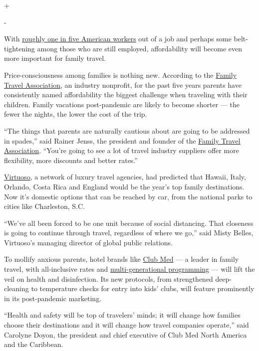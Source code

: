 +

-

With
\href{https://www.nytimes.com/2020/04/30/business/economy/coronavirus-unemployment-claims.html}{roughly
one in five American workers} out of a job and perhaps some
belt-tightening among those who are still employed, affordability will
become even more important for family travel.

Price-consciousness among families is nothing new. According to the
\href{https://familytravel.org/}{Family Travel Association}, an industry
nonprofit, for the past five years parents have consistently named
affordability the biggest challenge when traveling with their children.
Family vacations post-pandemic are likely to become shorter --- the
fewer the nights, the lower the cost of the trip.

``The things that parents are naturally cautious about are going to be
addressed in spades,'' said Rainer Jenss, the president and founder of
the \href{https://familytravel.org/}{Family Travel Association}.
``You're going to see a lot of travel industry suppliers offer more
flexibility, more discounts and better rates.''

\href{https://www.virtuoso.com/}{Virtuoso}, a network of luxury travel
agencies, had predicted that Hawaii, Italy, Orlando, Costa Rica and
England would be the year's top family destinations. Now it's domestic
options that can be reached by car, from the national parks to cities
like Charleston, S.C.

``We've all been forced to be one unit because of social distancing.
That closeness is going to continue through travel, regardless of where
we go,'' said Misty Belles, Virtuoso's managing director of global
public relations.

To mollify anxious parents, hotel brands like
\href{http://clubmed.com/}{Club Med} --- a leader in family travel, with
all-inclusive rates and
\href{https://www.clubmed.us/l/all-inclusive-resorts-for-families\#AmazingFamily}{multi-generational
programming} --- will lift the veil on health and disinfection. Its new
protocols, from strengthened deep-cleaning to temperature checks for
entry into kids' clubs, will feature prominently in its post-pandemic
marketing.

``Health and safety will be top of travelers' minds; it will change how
families choose their destinations and it will change how travel
companies operate,'' said Carolyne Doyon, the president and chief
executive of Club Med North America and the Caribbean.

